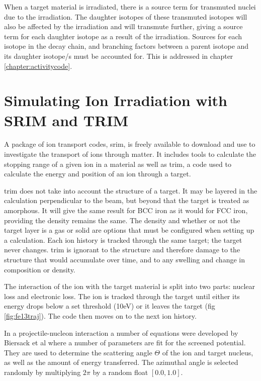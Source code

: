 When a target material is irradiated, there is a source term for transmuted nuclei due to the irradiation.  The daughter isotopes of these transmuted isotopes will also be affected by the irradiation and will transmute further, giving a source term for each daughter isotope as a result of the irradiation.  Sources for each isotope in the decay chain, and branching factors between a parent isotope and its daughter isotope/s must be accounted for.  This is addressed in chapter \ref{chapter:activitycode}.





\section[Using SRIM and TRIM]{Simulating Ion Irradiation with SRIM and TRIM}
\label{section:srimtrim}

A package of ion transport codes, \acrshort{srim}, is freely available to download and use to investigate the transport of ions through matter.  It includes tools to calculate the stopping range of a given ion in a material as well as \acrlong{trim}, a code used to calculate the energy and position of an ion through a target.

\acrshort{trim} does not take into account the structure of a target.  It may be layered in the calculation perpendicular to the beam, but beyond that the target is treated as amorphous.  It will give the same result for BCC iron as it would for FCC iron, providing the density remains the same.  The density and whether or not the target layer is a gas or solid are options that must be configured when setting up a calculation.  Each ion history is tracked through the same target; the target never changes.  \acrshort{trim} is ignorant to the structure and therefore damage to the structure that would accumulate over time, and to any swelling and change in composition or density.

The interaction of the ion with the target material is split into two parts: nuclear loss and electronic loss.  The ion is tracked through the target until either its energy drops below a set threshold (10eV) or it leaves the target (fig \ref{fig:fe13traj}).  The code then moves on to the next ion history.

In a projectile-nucleon interaction a number of equations were developed by Biersack et al\cite{srimbook} where a number of parameters are fit for the screened potential.  They are used to determine the scattering angle $\Theta$ of the ion and target nucleus, as well as the amount of energy transferred.  The azimuthal angle is selected randomly by multiplying $2\pi$ by a random float $[0.0, 1.0]$.

